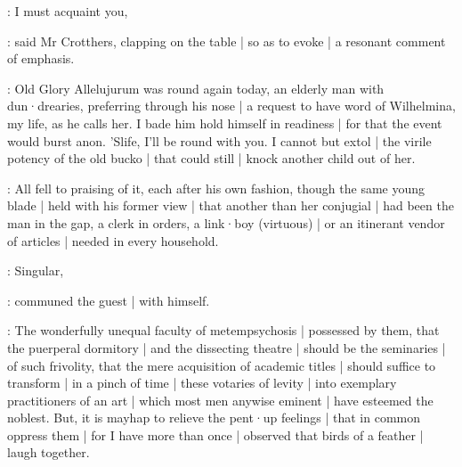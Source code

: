 \crotthers:
I must acquaint you,

:
said Mr Crotthers,
clapping on the table |
so as to evoke |
a resonant comment of emphasis.

\crotthers:
Old Glory Allelujurum was round again today,
an elderly man with dun·drearies,
preferring through his nose |
a request to have word of Wilhelmina,
my life,
as he calls her.
I bade him hold himself in readiness |
for that the event would burst anon.
'Slife,
I'll be round with you.
I cannot but extol |
the virile potency of the old bucko |
that could still |
knock another child out of her.

:
All fell to praising of it,
each after his own fashion,
though the same young blade |
held with his former view |
that another than her conjugial |
had been the man in the gap,
a clerk in orders,
a link·boy
(virtuous) |
or an itinerant vendor of articles |
needed in every household.

\Bloom:
Singular,

:
communed the guest |
with himself.

\Bloom:
The wonderfully unequal faculty of metempsychosis |
possessed by them,
that the puerperal dormitory |
and the dissecting theatre |
should be the seminaries |
of such frivolity,
that the mere acquisition of academic titles |
should suffice to transform |
in a pinch of time |
these votaries of levity |
into exemplary practitioners of an art |
which most men anywise eminent |
have esteemed the noblest.
But,
it is mayhap to relieve the pent·up feelings |
that in common oppress them |
for I have more than once |
observed that birds of a feather |
laugh together.

